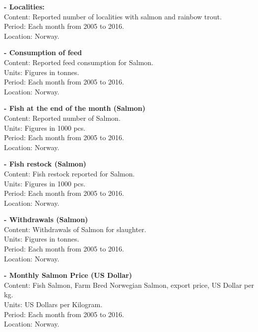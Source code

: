 \textbf{- Localities:}
	\\ Content: Reported number of localities with salmon and rainbow trout. 
	\\ Period: Each month  from 2005 to 2016.
	\\ Location: Norway.


\textbf{- Consumption of feed}
	\\ Content: Reported feed consumption for Salmon.
	\\ Units: Figures in tonnes.
	\\ Period: Each month  from 2005 to 2016.
	\\ Location: Norway.


\textbf{- Fish at the end of the month (Salmon)}
	\\ Content: Reported number of Salmon. 
	\\ Units: Figures in 1000 pcs.
	\\ Period: Each month  from 2005 to 2016.
	\\ Location: Norway.


\textbf{- Fish restock (Salmon)}
	\\ Content: Fish restock reported for Salmon.
	\\ Units: Figures in 1000 pcs.
	\\ Period: Each month  from 2005 to 2016.
	\\ Location: Norway.


\textbf{- Withdrawals (Salmon)}
	\\ Content: Withdrawals of Salmon for slaughter. 
	\\ Units: Figures in tonnes.
	\\ Period: Each month  from 2005 to 2016.
	\\ Location: Norway.


\textbf{- Monthly Salmon Price (US Dollar)}
	\\ Content: Fish Salmon, Farm Bred Norwegian Salmon, export price, US Dollar per kg. 
	\\ Units: US Dollars per Kilogram. 
	\\ Period: Each month  from 2005 to 2016.
	\\ Location: Norway.




